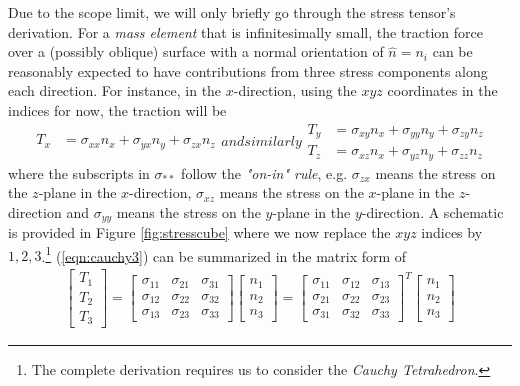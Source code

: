 Due to the scope limit, we will only briefly go through the stress tensor's derivation. For a \textit{mass element} that is infinitesimally small, the traction force over a (possibly oblique) surface with a normal orientation of $\hat{n} = n_i$ can be reasonably expected to have contributions from three stress components along each direction. For instance, in the $x$-direction, using the $xyz$ coordinates in the indices for now, the traction will be
\begin{subequations}
\label{eqn:cauchy3}
\begin{align}
T_x &= \sigma_{xx}n_x + \sigma_{yx}n_y + \sigma_{zx}n_z
\end{align}
and similarly
\begin{align}
T_y &= \sigma_{xy}n_x + \sigma_{yy}n_y + \sigma_{zy}n_z \\
T_z &= \sigma_{xz}n_x + \sigma_{yz}n_y + \sigma_{zz}n_z 
\end{align}
\end{subequations}
where the subscripts in $\sigma_{**}$ follow the \textit{"on-in" rule}, e.g. $\sigma_{zx}$ means the stress on the $z$-plane in the $x$-direction, $\sigma_{xz}$ means the stress on the $x$-plane in the $z$-direction and $\sigma_{yy}$ means the stress on the $y$-plane in the $y$-direction. A schematic is provided in Figure \ref{fig:stresscube} where we now replace the $xyz$ indices by $1,2,3$.\footnote{The complete derivation requires us to consider the \textit{Cauchy Tetrahedron}.} (\ref{eqn:cauchy3}) can be summarized in the matrix form of
\begin{align}
\begin{bmatrix}
T_1 \\
T_2 \\
T_3
\end{bmatrix}  
=
\begin{bmatrix}
\sigma_{11} & \sigma_{21} & \sigma_{31} \\
\sigma_{12} & \sigma_{22} & \sigma_{32} \\
\sigma_{13} & \sigma_{23} & \sigma_{33}
\end{bmatrix}
\begin{bmatrix}
n_1 \\
n_2 \\
n_3
\end{bmatrix}
=
\begin{bmatrix}
\sigma_{11} & \sigma_{12} & \sigma_{13} \\
\sigma_{21} & \sigma_{22} & \sigma_{23} \\
\sigma_{31} & \sigma_{32} & \sigma_{33}
\end{bmatrix}^T
\begin{bmatrix}
n_1 \\
n_2 \\
n_3
\end{bmatrix}
\label{eqn:cauchyT}
\end{align}
